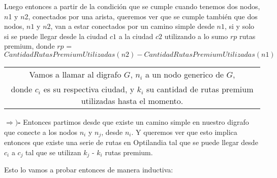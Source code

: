 \documentclass{article}
\begin{document}
\medskip
\par{Luego entonces a partir de la condición que se cumple cuando tenemos dos nodos, $n$1 y $n$2, conectados por una arista, queremos ver que se cumple también que dos nodos, $n1$ y $n2$, van a estar conectados por un camino simple desde $n1$, si y solo si se puede llegar desde la ciudad $c1$ a la ciudad $c2$ utilizando a lo sumo $rp$ rutas premium, donde $rp$ = $CantidadRutasPremiumUtilizadas(n2) - CantidadRutasPremiumUtilizadas(n1)$}
\medskip
\medskip
\medskip
\begin{center}
\begin{tabular}{|c|}
	\hline
 	Vamos a llamar al digrafo $G$, $n_{i}$ a un nodo generico de $G$,\\ donde $c_{i}$ es su respectiva ciudad, y $k_{i}$ su cantidad de rutas premium utilizadas hasta el momento. \\
	\hline
\end{tabular}

\end{center}
\medskip

\par{\textbf{$\Rightarrow)$-} Entonces partimos desde que existe un camino simple en nuestro digrafo que conecte a los nodos $n_{i}$ y $n_{j}$, desde $n_{i}$. Y queremos ver que esto implica entonces que existe una serie de rutas en Optilandia tal que se puede llegar desde $c_{i}$ a $c_{j}$ tal que se utilizan $k_{j}$ - $k_{i}$ rutas premium.}
\medskip
\par{Esto lo vamos a probar entonces de manera inductiva:}
\medskip
\end{document}
